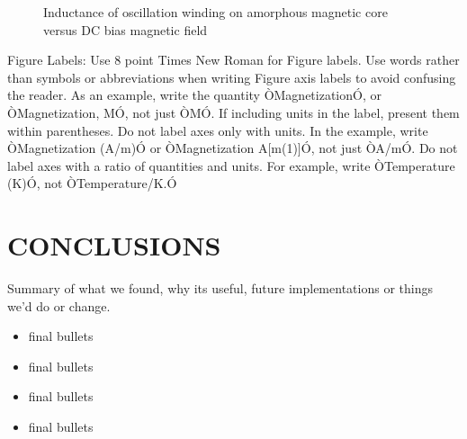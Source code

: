 \documentclass[letterpaper, 10 pt, conference]{ieeeconf}  %
\begin{document}
   \begin{figure}[thpb]
      \centering
      \caption{Inductance of oscillation winding on amorphous
       magnetic core versus DC bias magnetic field}
      \label{figurelabel}
   \end{figure}
   

Figure Labels: Use 8 point Times New Roman for Figure labels. Use words rather than symbols or abbreviations when writing Figure axis labels to avoid confusing the reader. As an example, write the quantity ÒMagnetizationÓ, or ÒMagnetization, MÓ, not just ÒMÓ. If including units in the label, present them within parentheses. Do not label axes only with units. In the example, write ÒMagnetization (A/m)Ó or ÒMagnetization {A[m(1)]}Ó, not just ÒA/mÓ. Do not label axes with a ratio of quantities and units. For example, write ÒTemperature (K)Ó, not ÒTemperature/K.Ó


\section{CONCLUSIONS}

Summary of what we found, why its useful, future implementations or things we'd do or change.

\begin{itemize}

\item final bullets 
\item final bullets 
\item final bullets 
\item final bullets 
\end{itemize}

\addtolength{\textheight}{-12cm}   %
\end{document}
